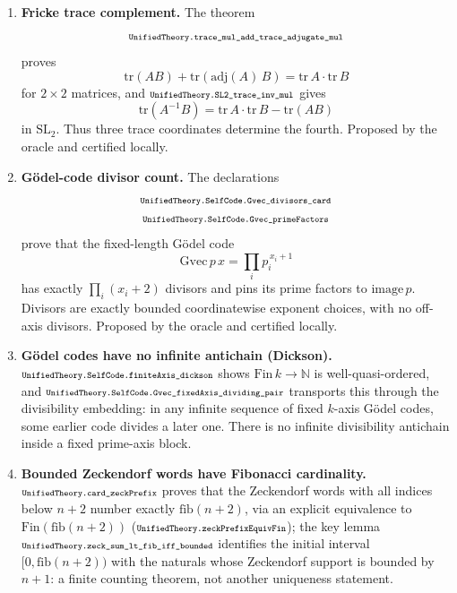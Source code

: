 \documentclass[11pt]{article}
\newcommand{\lean}[1]{\relax\ifmmode\hbox{\scriptsize\ttfamily\detokenize{#1}}\else{\small\texttt{\detokenize{#1}}}\fi}
\begin{document}
\begin{enumerate}[label=(O\arabic*)]
  $$
    \lean{UnifiedTheory.traceStep_zmod_pure_periodic}
  $$
  shows that modulo every $q$, each state is purely periodic: there are no preperiodic tails and no state merging.  The trace dynamics loses no information.  Proposed by the oracle and certified locally.
  \item \textbf{Fricke trace complement.}  The theorem
  $$
    \lean{UnifiedTheory.trace_mul_add_trace_adjugate_mul}
  $$
  proves
  $$
    \mathrm{tr}(AB)+\mathrm{tr}(\mathrm{adj}(A)\,B)=\mathrm{tr}\,A\cdot\mathrm{tr}\,B
  $$
  for $2\times2$ matrices, and $\lean{UnifiedTheory.SL2_trace_inv_mul}$ gives
  $$
    \mathrm{tr}(A^{-1}B)=\mathrm{tr}\,A\cdot\mathrm{tr}\,B-\mathrm{tr}(AB)
  $$
  in $\mathrm{SL}_2$.  Thus three trace coordinates determine the fourth.  Proposed by the oracle and certified locally.
  \item \textbf{G\"odel-code divisor count.}  The declarations
  $$
    \begin{gathered}
    \lean{UnifiedTheory.SelfCode.Gvec_divisors_card}\\
    \lean{UnifiedTheory.SelfCode.Gvec_primeFactors}
    \end{gathered}
  $$
  prove that the fixed-length G\"odel code
  $$
    \mathrm{Gvec}\,p\,x=\prod_i p_i^{\,x_i+1}
  $$
  has exactly $\prod_i(x_i+2)$ divisors and pins its prime factors to $\mathrm{image}\,p$.  Divisors are exactly bounded coordinatewise exponent choices, with no off-axis divisors.  Proposed by the oracle and certified locally.
  \item \textbf{G\"odel codes have no infinite antichain (Dickson).}  $\lean{UnifiedTheory.SelfCode.finiteAxis_dickson}$ shows $\mathrm{Fin}\,k\to\mathbb{N}$ is well-quasi-ordered, and $\lean{UnifiedTheory.SelfCode.Gvec_fixedAxis_dividing_pair}$ transports this through the divisibility embedding: in any infinite sequence of fixed $k$-axis G\"odel codes, some earlier code divides a later one.  There is no infinite divisibility antichain inside a fixed prime-axis block.
  \item \textbf{Bounded Zeckendorf words have Fibonacci cardinality.}  $\lean{UnifiedTheory.card_zeckPrefix}$ proves that the Zeckendorf words with all indices below $n{+}2$ number exactly $\mathrm{fib}(n{+}2)$, via an explicit equivalence to $\mathrm{Fin}(\mathrm{fib}(n{+}2))$ ($\lean{UnifiedTheory.zeckPrefixEquivFin}$); the key lemma $\lean{UnifiedTheory.zeck_sum_lt_fib_iff_bounded}$ identifies the initial interval $[0,\mathrm{fib}(n{+}2))$ with the naturals whose Zeckendorf support is bounded by $n{+}1$: a finite counting theorem, not another uniqueness statement.
\end{enumerate}
\end{document}

